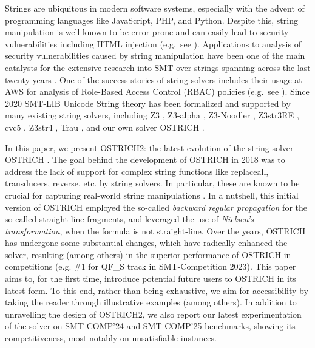 

Strings are ubiquitous in modern software systems, especially with the
advent of programming languages like JavaScript, PHP, and Python. Despite this, 
string manipulation is well-known to be error-prone and can easily lead to 
security vulnerabilities including HTML injection (e.g.\ see \cite{Kern14,LB16}).
Applications to analysis of security vulnerabilities caused by string
manipulation have been one of the main catalysts for the extensive research into
SMT over strings spanning across the last twenty years
\cite{LB16,DBLP:conf/cav/AbdullaACHRRS15,ostrich,Berkeley-JavaScript,HAMPI,BTV09,string-survey}.
One of the success stories of string solvers includes their usage at AWS
for analysis of Role-Based Access Control (RBAC) policies (e.g.\ see
\cite{neha,Cook18}).
Since 2020 SMT-LIB Unicode String theory \cite{SMTLIB} has been formalized and supported by
many existing string solvers, including Z3 \cite{z3}, Z3-alpha \cite{z3alpha}, Z3-Noodler \cite{noodler,noodler-int,noodler-len, noodler-tool}, Z3str3RE \cite{z3str3re},
cvc5 \cite{cvc5}, Z3str4 \cite{z3str4}, Trau \cite{trau0,trau-tool,trau2}, and our own solver OSTRICH \cite{ostrich}.

In this paper, we present OSTRICH2: the latest evolution of the string solver 
OSTRICH \cite{ostrich}. The goal behind the development of OSTRICH in 2018 was 
to address the lack of support for complex string functions like replaceall, 
transducers, reverse, etc. by string solvers. In particular, these are known to
be crucial for capturing real-world string manipulations
\cite{Berkeley-JavaScript,framework,LB16}. In a nutshell, this initial version
of OSTRICH employed the so-called \emph{backward regular propagation} for the
so-called straight-line fragments, and leveraged the use of \emph{Nielsen's
transformation}, when the formula is not straight-line. Over the years, 
OSTRICH has undergone some substantial changes, which have radically enhanced
the solver, resulting (among others) in the superior performance of OSTRICH in
competitions (e.g. \#1 for QF\_S track in SMT-Competition 2023). This paper aims
to, for the first time, introduce potential future users to OSTRICH in its
latest form. To this end, rather than being exhaustive, we aim for 
accessibility by taking the reader through illustrative examples (among others).
In addition to unravelling the design of OSTRICH2, we also report our latest
experimentation of the solver on SMT-COMP'24 and SMT-COMP'25 benchmarks, showing
its competitiveness, most notably on unsatisfiable instances.


